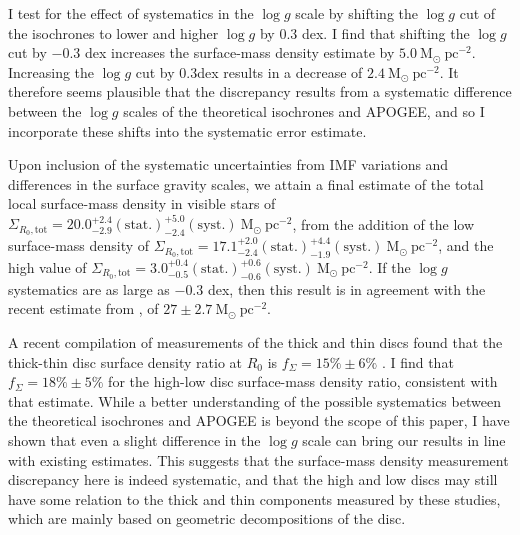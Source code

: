 I test for the effect of systematics in the $\log{g}$ scale by shifting the $\log{g}$ cut of the isochrones to lower and higher $\log{g}$ by $0.3$ dex. I find that shifting the $\log{g}$ cut by $-0.3$ dex increases the surface-mass density estimate by $5.0\ \mathrm{M_{\odot}\ pc^{-2}}$. Increasing the $\log{g}$ cut by $0.3$dex results in a decrease of $ 2.4\ \mathrm{M_{\odot}\ pc^{-2}}$. It therefore seems plausible that the discrepancy results from a systematic difference between the $\log{g}$ scales of the theoretical isochrones and APOGEE, and so I incorporate these shifts into the systematic error estimate. 

Upon inclusion of the systematic uncertainties from IMF variations and differences in the surface gravity scales, we attain a final estimate of the total local surface-mass density in visible stars of $\Sigma_{R_0, \text{tot}} = 20.0_{-2.9}^{+2.4}\mathrm{(stat.)}_{-2.4}^{+5.0}\mathrm{(syst.)}\ \mathrm{M_{\odot} \ pc^{-2}}$, from the addition of the low \afe{} surface-mass density of $\Sigma_{R_0, \text{tot}} = 17.1_{-2.4}^{+2.0}\mathrm{(stat.)}_{-1.9}^{+4.4}\mathrm{(syst.)}\ \mathrm{M_{\odot} \ pc^{-2}}$, and the high \afe{} value of $\Sigma_{R_0, \text{tot}} = 3.0_{-0.5}^{+0.4}\mathrm{(stat.)}_{-0.6}^{+0.6}\mathrm{(syst.)}\ \mathrm{M_{\odot} \ pc^{-2}}$.  If the $\log{g}$ systematics are as large as $-0.3$ dex, then this result is in agreement with the recent estimate from \citet{2015ApJ...814...13M}, of $27\pm 2.7\ \mathrm{M_{\odot} \ pc^{-2}}$.

A recent compilation of measurements of the thick and thin discs found that the thick-thin disc surface density ratio at $R_0$ is $f_{\Sigma} = 15\% \pm 6\%$ \citep{2016ARA&A..54..529B}. I find that $f_{\Sigma} = 18\% \pm 5\%$ for the high-low \afe{} disc surface-mass density ratio, consistent with that estimate. While a better understanding of the possible systematics between the theoretical isochrones and APOGEE is beyond the scope of this paper, I have shown that even a slight difference in the $\log{g}$ scale can bring our results in line with existing estimates. This suggests that the surface-mass density measurement discrepancy here is indeed systematic, and that the high and low \afe{} discs may still have some relation to the thick and thin components measured by these studies, which are mainly based on geometric decompositions of the disc. 

